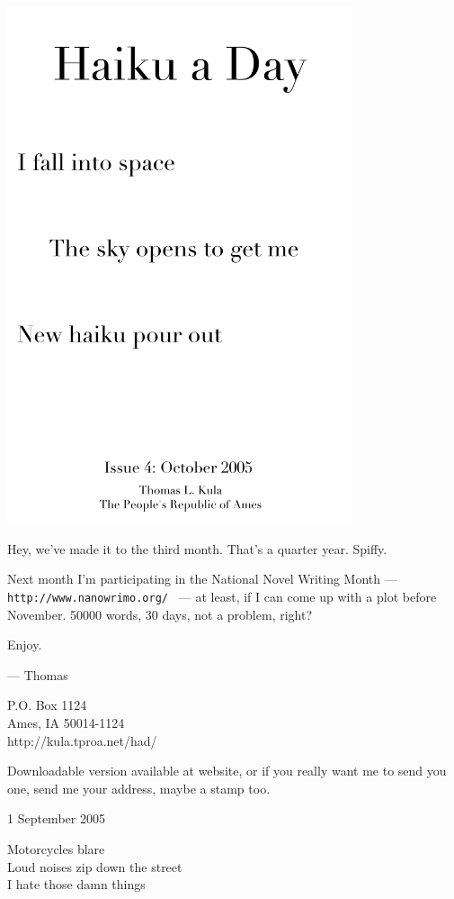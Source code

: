 \documentclass[12pt]{article}
\begin{document}
\includegraphics[width=101mm]{frontpage.png}

\newpage

Hey, we've made it to the third month. That's a quarter year.
Spiffy.

Next month I'm participating in the National Novel Writing
Month --- {\tt http://www.nanowrimo.org/ } --- at least,
if I can come up with a plot before November. 50000 words,
30 days, not a problem, right?


Enjoy.

--- Thomas

P.O. Box 1124 \\
Ames, IA 50014-1124 \\
http://kula.tproa.net/had/

Downloadable version available at website, or if you really
want me to send you one, send me your address, maybe a
stamp too.

\newpage
\setlength{\parskip}{1mm}

1 September 2005

Motorcycles blare \\
Loud noises zip down the street \\
I hate those damn things \\
\end{document}
